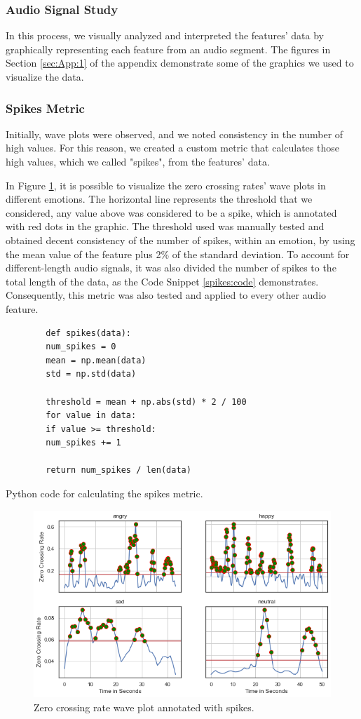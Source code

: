 \subsubsection{Audio Signal Study}

In this process, we visually analyzed and interpreted the features' data by graphically representing each feature from an audio segment. The figures in Section \ref{sec:App:1} of the appendix demonstrate some of the graphics we used to visualize the data.

\subsubsection{Spikes Metric}
\label{spikes:metric}

Initially, wave plots were observed, and we noted consistency in the number of high values. For this reason, we created a custom metric that calculates those high values, which we called "spikes", from the features' data.

In Figure \ref{fig:zcrSpikes}, it is possible to visualize the zero crossing rates' wave plots in different emotions. The horizontal line represents the threshold that we considered, any value above was considered to be a spike, which is annotated with red dots in the graphic. The threshold used was manually tested and obtained decent consistency of the number of spikes, within an emotion, by using the mean value of the feature plus 2\% of the standard deviation. To account for different-length audio signals, it was also divided the number of spikes to the total length of the data, as the Code Snippet \ref{spikes:code} demonstrates. Consequently, this metric was also tested and applied to every other audio feature.

\begin{listing}[H]
	\begin{verbatim}
		def spikes(data):
		num_spikes = 0
		mean = np.mean(data)
		std = np.std(data)
		
		threshold = mean + np.abs(std) * 2 / 100
		for value in data:
		if value >= threshold:
		num_spikes += 1
		
		return num_spikes / len(data)
	\end{verbatim}
	\caption{Python code for calculating the spikes metric.}
	\label{spikes:code}
\end{listing}

\begin{figure}[H]
	\centering
	\includegraphics[width=.7\textwidth]{figs/4_1_traditional/zcr_waveplot_spikes.png}
	\caption{Zero crossing rate wave plot annotated with spikes.}
	\label{fig:zcrSpikes}
\end{figure}


